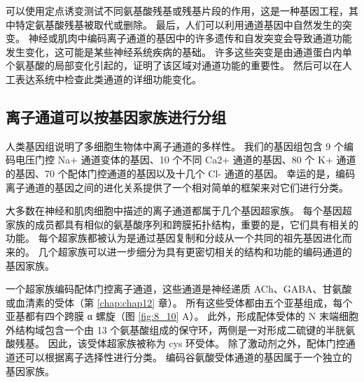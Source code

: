 可以使用定点诱变测试不同氨基酸残基或残基片段的作用，这是一种基因工程，其中特定氨基酸残基被取代或删除。 
最后，人们可以利用通道基因中自然发生的突变。 
神经或肌肉中编码离子通道的基因中的许多遗传和自发突变会导致通道功能发生变化，这可能是某些神经系统疾病的基础。 
许多这些突变是由通道蛋白内单个氨基酸的局部变化引起的，证明了该区域对通道功能的重要性。 
然后可以在人工表达系统中检查此类通道的详细功能变化。



\subsection{离子通道可以按基因家族进行分组}
人类基因组说明了多细胞生物体中离子通道的多样性。 我们的基因组包含 9 个编码电压门控 Na+ 通道变体的基因、10 个不同 Ca2+ 通道的基因、80 个 K+ 通道的基因、70 个配体门控通道的基因以及十几个 Cl- 通道的基因。 
幸运的是，编码离子通道的基因之间的进化关系提供了一个相对简单的框架来对它们进行分类。


大多数在神经和肌肉细胞中描述的离子通道都属于几个基因超家族。 
每个基因超家族的成员都具有相似的氨基酸序列和跨膜拓扑结构，重要的是，它们具有相关的功能。 
每个超家族都被认为是通过基因复制和分歧从一个共同的祖先基因进化而来的。 
几个超家族可以进一步细分为具有更密切相关的结构和功能的编码通道的基因家族。


一个超家族编码配体门控离子通道，这些通道是神经递质 ACh、GABA、甘氨酸或血清素的受体（第 \ref{chap:chap12} 章）。 
所有这些受体都由五个亚基组成，每个亚基都有四个跨膜 α 螺旋（图 \ref{fig:8_10} A）。 
此外，形成配体受体的 N 末端细胞外结构域包含一个由 13 个氨基酸组成的保守环，两侧是一对形成二硫键的半胱氨酸残基。 
因此，该受体超家族被称为 cys 环受体。 
除了激动剂之外，配体门控通道还可以根据离子选择性进行分类。 
编码谷氨酸受体通道的基因属于一个独立的基因家族。

